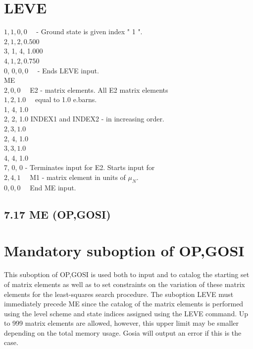 \documentclass[10pt]{article}
\begin{document}
\section*{LEVE}
$1,1,0,0 \quad$ - Ground state is given index " 1 ".\\
$2,1,2,0.500$\\
3, 1, 4, 1.000\\
$4,1,2,0.750$\\
0, $0,0,0 \quad$ - Ends LEVE input.\\
ME\\
$2,0,0 \quad$ E2 - matrix elements. All E2 matrix elements\\
$1,2,1.0 \quad$ equal to 1.0 e.barns.\\
1, 4, 1.0\\
2, 2, 1.0 INDEX1 and INDEX2 - in increasing order.\\
$2,3,1.0$\\
2, 4, 1.0\\
$3,3,1.0$\\
4, 4, 1.0\\
7, 0, 0 - Terminates input for E2. Starts input for\\
$2,4,1 \quad$ M1 - matrix element in units of $\mu_{N}$.\\
$0,0,0 \quad$ End ME input.

\subsection*{7.17 ME (OP,GOSI)}
\section*{Mandatory suboption of OP,GOSI}
This suboption of OP,GOSI is used both to input and to catalog the starting set of matrix elements as well as to set constraints on the variation of these matrix elements for the least-squares search procedure. The suboption LEVE must immediately precede ME since the catalog of the matrix elements is performed using the level scheme and state indices assigned using the LEVE command. Up to 999 matrix elements are allowed, however, this upper limit may be smaller depending on the total memory usage. Gosia will output an error if this is the case.
\end{document}
